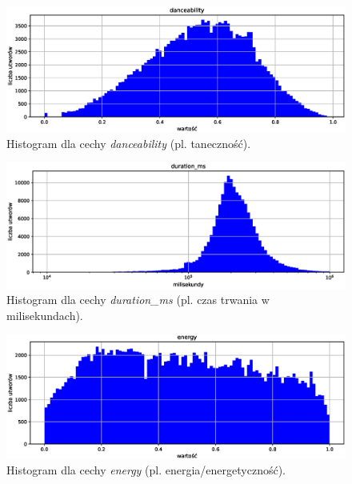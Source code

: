 \documentclass[a4paper,11pt]{article}
\begin{document}
    \smallskip

    \begin{figure}[H]
        \label{fig:danceability}
        \centering
        \includegraphics[width=\textwidth]{danceability}
        \caption{Histogram dla cechy \textit{danceability} (pl. taneczność).}
    \end{figure}

    \smallskip

    \begin{figure}[H]
        \label{fig:duration_ms}
        \centering
        \includegraphics[width=\textwidth]{duration_ms}
        \caption{Histogram dla cechy \textit{duration\_ms} (pl. czas trwania w milisekundach).}
    \end{figure}

    \smallskip

    \begin{figure}[H]
        \label{fig:energy}
        \centering
        \includegraphics[width=\textwidth]{energy}
        \caption{Histogram dla cechy \textit{energy} (pl. energia/energetyczność).}
    \end{figure}
\end{document}
